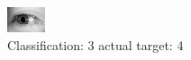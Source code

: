 \begin{figure}[h!]
\begin{center}
\includegraphics[width=0.60\columnwidth]{figures/ID3211_class_3_target_4.png}
\end{center}
\caption{ Classification: 3 actual target: 4}
\label{fig:ID3211_class_3_target_4}
\end{figure}
